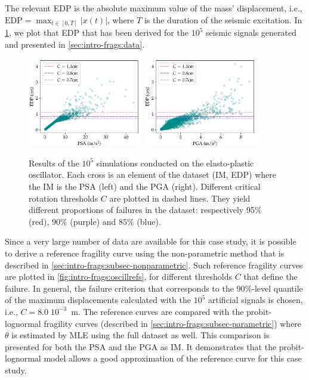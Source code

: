     
    
    The relevant EDP is the absolute maximum value of the mass’ displacement, i.e., $\text{EDP}=\max_{t\in [0, T]}|x(t)|$, where $T$ is the duration of the seismic excitation. In \cref{fig:intro-frags:oscillclouds}, we plot that EDP that has been derived for the $10^5$ seismic signals generated and presented in \cref{sec:intro-frags:data}.

    \begin{figure}[h]
        \centering
        \includegraphics[width=5cm]{figures/intro-frags/oscill/cloudPSA.pdf}
        \includegraphics[width=5cm]{figures/intro-frags/oscill/cloudPGA.pdf}
        \caption{Results of the $10^5$ simulations conducted on the elasto-plastic oscillator. Each cross is an element of the dataset (IM, EDP) where the IM is the PSA (left) and the PGA (right). Different critical rotation thresholds $C$ are plotted in dashed lines. They yield different proportions of failures in the dataset: respectively 95$\%$ (red), $90\%$ (purple) and $85\%$ (blue).}
        \label{fig:intro-frags:oscillclouds}
    \end{figure}


    Since a very large number of data are available for this case study, it is possible to derive a reference fragility curve using the non-parametric method that is described in \cref{sec:intro-frags:subsec-nonparametric}.
    Such reference fragility curves are plotted in \cref{fig:intro-frags:oscillrefs}, for different thresholds $ C $ that define the failure.
    In general, the failure criterion that corresponds to the $90\%$-level quantile of the maximum displacements calculated with the $10^5$ artificial signals is chosen, i.e., $C = 8.0 \; 10^{-3}$~m.
    The reference 
    curves are compared with the probit-lognormal fragility curves (described in \cref{sec:intro-frags:subsec-parametric}) where $\theta$ is estimated by MLE using the full dataset as well. This comparison is presented for both the PSA and the PGA as IM.
    It demonstrates that the probit-lognormal model allows a good approximation of the reference curve for this case study.

